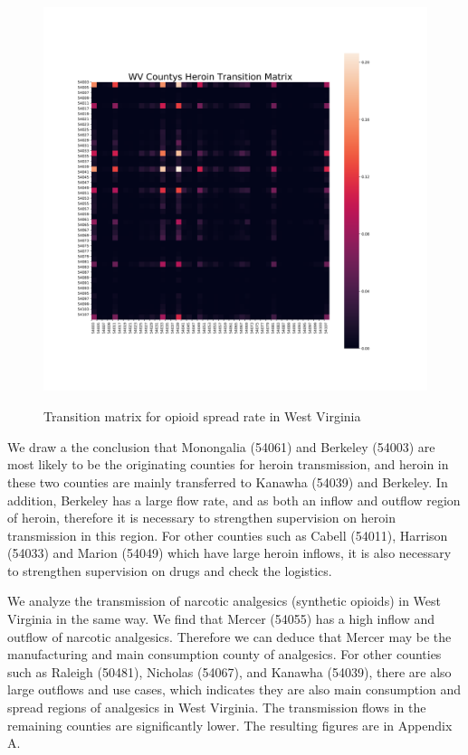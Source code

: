 \begin {figure}[h]
	\centering %
	\includegraphics[width=15cm,height=12cm]{figure/3.png}
	\caption{Transition matrix for opioid spread rate in West Virginia} %
	\label{WV}
\end {figure}

We draw a the conclusion that Monongalia (54061) and Berkeley (54003) are most likely to be the originating counties for heroin transmission, and heroin in these two counties are mainly transferred to Kanawha (54039) and Berkeley. In addition, Berkeley has a large flow rate, and as both an inflow and outflow  region of heroin, therefore it is necessary to strengthen supervision on heroin transmission in this region. For other counties such as Cabell (54011), Harrison (54033) and Marion (54049) which have large heroin inflows, it is also necessary to strengthen supervision on drugs and check the logistics.

We analyze the transmission of narcotic analgesics (synthetic opioids) in West Virginia in the same way. We find that Mercer (54055) has a high inflow and outflow of narcotic analgesics. Therefore we can deduce that Mercer may be the manufacturing and main consumption county of analgesics. For other counties such as Raleigh (50481), Nicholas (54067), and Kanawha (54039), there are also large outflows and use cases, which indicates they are also main consumption and spread regions of analgesics in West Virginia. The transmission flows in the remaining counties are significantly lower. The resulting figures are in Appendix A.

